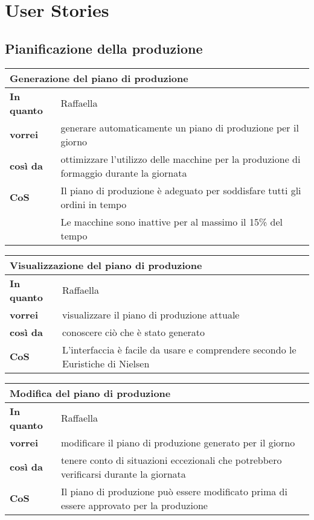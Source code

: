 \chapter{User Stories}
\label{app:user-stories}

\section{Pianificazione della produzione}

\begin{tabularx}{\textwidth}{lX}
\toprule
\multicolumn{2}{l}{\textbf{Generazione del piano di produzione}} \\
\midrule
\textbf{In quanto} & Raffaella \\
\textbf{vorrei} & generare automaticamente un piano di produzione per il giorno \\
\textbf{così da} & ottimizzare l'utilizzo delle macchine per la produzione di formaggio durante la giornata \\
\midrule
\textbf{CoS} & Il piano di produzione è adeguato per soddisfare tutti gli ordini in tempo \\
& Le macchine sono inattive per al massimo il 15\% del tempo \\
\bottomrule
\end{tabularx}

\begin{tabularx}{\textwidth}{lX}
  \toprule
  \multicolumn{2}{l}{\textbf{Visualizzazione del piano di produzione}} \\
  \midrule
  \textbf{In quanto} & Raffaella \\
  \textbf{vorrei} & visualizzare il piano di produzione attuale \\
  \textbf{così da} & conoscere ciò che è stato generato \\
  \midrule
  \textbf{CoS} & L'interfaccia è facile da usare e comprendere secondo le Euristiche di Nielsen~\cite{cit:nielsen} \\
  \bottomrule
\end{tabularx}

\begin{tabularx}{\textwidth}{lX}
  \toprule
  \multicolumn{2}{l}{\textbf{Modifica del piano di produzione}} \\
  \midrule
  \textbf{In quanto} & Raffaella \\
  \textbf{vorrei} & modificare il piano di produzione generato per il giorno \\
  \textbf{così da} & tenere conto di situazioni eccezionali che potrebbero verificarsi durante la giornata \\
  \midrule
  \textbf{CoS} & Il piano di produzione può essere modificato prima di essere approvato per la produzione \\
  \bottomrule
\end{tabularx}

